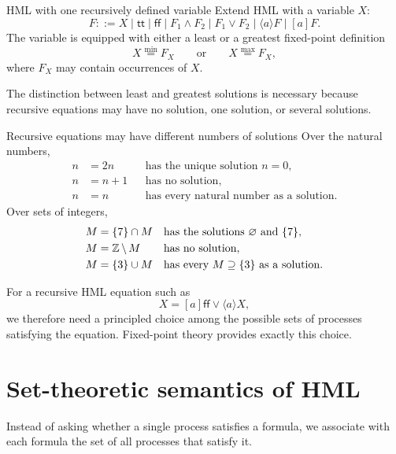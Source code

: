 \documentclass[a4paper]{article}
\newcommand{\ttt}{\mathsf{tt}}
\newcommand{\fff}{\mathsf{ff}}
\begin{document}
\begin{snippetdefinition}{HML with one recursively defined variable}
    Extend HML with a variable \(X\):
    \[
        F ::= X\mid\ttt\mid\fff\mid F_1\land F_2\mid F_1\lor F_2
        \mid\langle a\rangle F\mid[a]F.
    \]
    The variable is equipped with either a least or a greatest fixed-point definition
    \[
        X\overset{\min}{=}F_X
        \qquad\text{or}\qquad
        X\overset{\max}{=}F_X,
    \]
    where \(F_X\) may contain occurrences of \(X\).
\end{snippetdefinition}

The distinction between least and greatest solutions is necessary because recursive equations may have no solution, one solution, or several solutions.

\begin{snippetexample}{Recursive equations may have different numbers of solutions}
    Over the natural numbers,
    \begin{align*}
        n &= 2n &&\text{has the unique solution }n=0,\\
        n &= n+1 &&\text{has no solution},\\
        n &= n &&\text{has every natural number as a solution}.
    \end{align*}
    Over sets of integers,
    \begin{align*}
        M &= \{7\}\cap M
        &&\text{has the solutions }\varnothing\text{ and }\{7\},\\
        M &= \mathbb{Z}\,\backslash\, M
        &&\text{has no solution},\\
        M &= \{3\}\cup M
        &&\text{has every }M\supseteq\{3\}\text{ as a solution}.
    \end{align*}
\end{snippetexample}

For a recursive HML equation such as
\[
    X=[a]\fff\lor\langle a\rangle X,
\]
we therefore need a principled choice among the possible sets of processes satisfying the equation.
Fixed-point theory provides exactly this choice.

\section{Set-theoretic semantics of HML}

Instead of asking whether a single process satisfies a formula, we associate with each formula the set of all processes that satisfy it.
\end{document}
